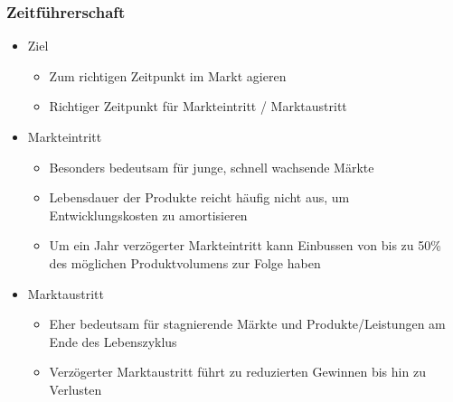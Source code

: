 \subsubsection{Zeitführerschaft}
\begin{itemize}
	\item Ziel
	\begin{itemize}
		\item Zum richtigen Zeitpunkt im Markt agieren
		\item Richtiger Zeitpunkt für Markteintritt / Marktaustritt
	\end{itemize}
	\item Markteintritt
	\begin{itemize}
		\item Besonders bedeutsam für junge, schnell wachsende Märkte
		\item Lebensdauer der Produkte reicht häufig nicht aus, um Entwicklungskosten zu amortisieren
		\item Um ein Jahr verzögerter Markteintritt kann Einbussen von bis zu 50\% des möglichen Produktvolumens zur Folge haben
	\end{itemize}
	\item Marktaustritt
	\begin{itemize}
		\item Eher bedeutsam für stagnierende Märkte und Produkte/Leistungen am Ende des Lebenszyklus
		\item Verzögerter Marktaustritt führt zu reduzierten Gewinnen bis hin zu Verlusten
	\end{itemize}
\end{itemize}

